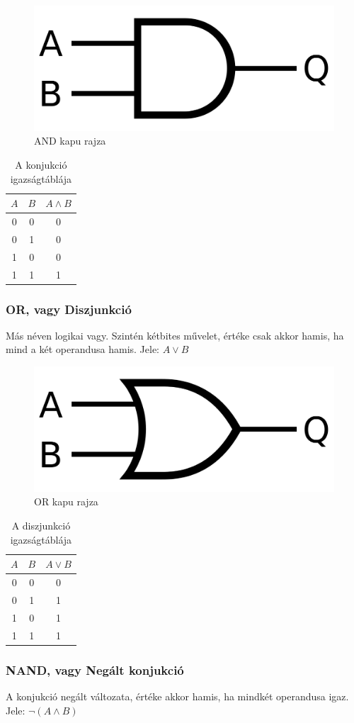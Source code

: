 \documentclass[
]{thesis-ekf}
\theoremstyle{definition}
\theoremstyle{remark}
\begin{document}
\begin{figure}[H]
	\centering
	\includegraphics[width=0.3\linewidth]{and}
	\caption{AND kapu rajza}
	\label{fig:and}
\end{figure}


\begin{table}[H]
	\centering
	\begin{tabular}{c|c|c}
		$A$ & $B$ & $A \land B$\\               
		\hline
		0 & 0 & 0\\
		0 & 1 & 0\\
		1 & 0 & 0\\
		1 & 1 & 1
	\end{tabular}
	\caption{A konjukció igazságtáblája}
\end{table}

\subsubsection{OR, vagy Diszjunkció}
Más néven logikai vagy. Szintén kétbites művelet, értéke csak akkor hamis, ha mind a két operandusa hamis. Jele: $A \lor B$

\begin{figure}[H]
	\centering
	\includegraphics[width=0.3\linewidth]{or}
	\caption{OR kapu rajza}
	\label{fig:or}
\end{figure}


\begin{table}[H]
	\centering
	\begin{tabular}{c|c|c}
		$A$ & $B$ & $A \lor B$\\               
		\hline
		0 & 0 & 0\\
		0 & 1 & 1\\
		1 & 0 & 1\\
		1 & 1 & 1
	\end{tabular}
	\caption{A diszjunkció igazságtáblája}
\end{table}

\subsubsection{NAND, vagy Negált konjukció}
A konjukció negált változata, értéke akkor hamis, ha mindkét operandusa igaz. Jele: $\neg(A \land B)$
\end{document}
